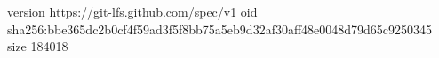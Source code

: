 version https://git-lfs.github.com/spec/v1
oid sha256:bbe365dc2b0cf4f59ad3f5f8bb75a5eb9d32af30aff48e0048d79d65c9250345
size 184018
